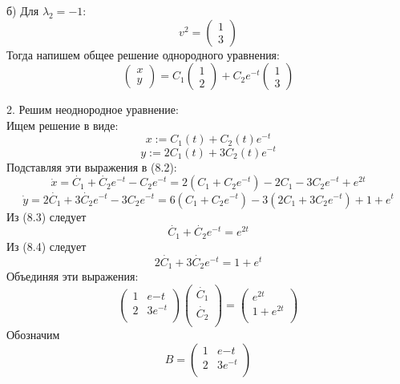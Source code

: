 \documentclass[10pt]{report}
\begin{document}
б) Для $\lambda_2=-1:$
\[v^2=
\left(
\begin{array}{c}
1\\
3
\end{array}
\right)
\]
Тогда напишем общее решение однородного уравнения:
\[
\left(
\begin{array}{c}
x\\
y
\end{array}
\right)
= C_1
\left(
\begin{array}{c}
1\\
2
\end{array}
\right)
+C_2e^{-t}
\left(
\begin{array}{c}
1\\
3
\end{array}
\right)
\]

2. Решим неоднородное уравнение:\\
Ищем решение в виде:
\[x := C_1(t)+C_2(t)e^{-t}\]
\[y := 2C_1(t)+3C_2(t)e^{-t}\]
Подставляя эти выражения в (8.2):
\begin{equation}
\dot{x} = \dot{C_1}+\dot{C_2}e^{-t}-C_2e^{-t}=2(C_1+C_2e^{-t})-2C_1-3C_2e^{-t}+e^{2t}
\end{equation}
\begin{equation}
\dot{y} = 2\dot{C_1}+3\dot{C_2}e^{-t}-3C_2e^{-t}=6(C_1+C_2e^{-t})-3(2C_1+3C_2e^{-t})+1+e^{t}
\end{equation}
Из (8.3) следует
\[ \dot{C_1}+\dot{C_2}e^{-t}=e^{2t}\]
Из (8.4) следует
\[ 2\dot{C_1}+3\dot{C_2}e^{-t}=1+e^{t}\]
Объединяя эти выражения:
\begin{equation}
\left(
\begin{array}{cc}
1 & e{-t}\\
2 & 3e^{-t}\\
\end{array}
\right)
\left(
\begin{array}{c}
\dot{C_1}\\
\dot{C_2}\\
\end{array}
\right)=
\left(
\begin{array}{c}
e^{2t}\\
1+e^{2t}\\
\end{array}
\right)
\end{equation}
Обозначим 
\[ B=
\left(
\begin{array}{cc}
1 & e{-t}\\
2 & 3e^{-t}\\
\end{array}
\right)\]
\end{document}
